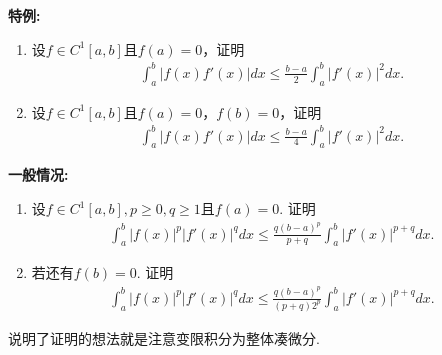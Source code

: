 \documentclass[../../main.tex]{subfiles}
\begin{document}
\begin{example}[$\,\,$opial不等式]\label{example:opial不等式}

\textbf{特例:}
\begin{enumerate}
\item 设\(f \in C^1[a,b]\)且\(f(a) = 0\)，证明
\begin{align*}
\int_{a}^{b}|f(x)f'(x)|dx \leqslant \frac{b - a}{2}\int_{a}^{b}|f'(x)|^{2}dx.
\end{align*}

\item 设\(f \in C^1[a,b]\)且\(f(a) = 0\)，\(f(b) = 0\)，证明
\begin{align*}
\int_{a}^{b}|f(x)f'(x)|dx \leqslant \frac{b - a}{4}\int_{a}^{b}|f'(x)|^{2}dx.
\end{align*} 
\end{enumerate}

\textbf{一般情况:}
\begin{enumerate}
\item 设\(f \in C^1[a,b], p\geqslant0, q\geqslant1\)且\(f(a) = 0\). 证明
\begin{align}
\int_{a}^{b}|f(x)|^{p}|f'(x)|^{q}dx \leqslant \frac{q(b - a)^{p}}{p + q}\int_{a}^{b}|f'(x)|^{p + q}dx. \label{equation----:::16.37}
\end{align}

\item 若还有\(f(b) = 0\). 证明
\begin{align}
\int_{a}^{b}|f(x)|^{p}|f'(x)|^{q}dx \leqslant \frac{q(b - a)^{p}}{(p + q)2^{p}}\int_{a}^{b}|f'(x)|^{p + q}dx. \label{equation----:::16.38}
\end{align}
\end{enumerate}
\end{example}
\begin{note}
说明了证明的想法就是注意变限积分为整体凑微分.
\end{note}
\end{document}
